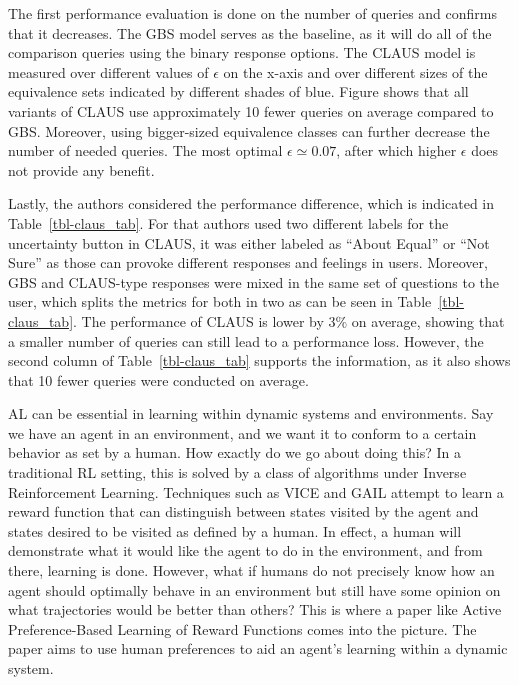 \documentclass[
  letterpaper,
  numbers=noenddot,
  DIV=11]{scrreprt}
\theoremstyle{plain}
\theoremstyle{definition}
\theoremstyle{remark}
\begin{document}
The first performance evaluation is done on the number of queries and
confirms that it decreases. The GBS model serves as the baseline, as it
will do all of the comparison queries using the binary response options.
The CLAUS model is measured over different values of \(\epsilon\) on the
x-axis and over different sizes of the equivalence sets indicated by
different shades of blue. Figure shows that all variants of CLAUS use
approximately 10 fewer queries on average compared to GBS. Moreover,
using bigger-sized equivalence classes can further decrease the number
of needed queries. The most optimal \(\epsilon \simeq 0.07\), after
which higher \(\epsilon\) does not provide any benefit.

Lastly, the authors considered the performance difference, which is
indicated in Table~\ref{tbl-claus_tab}. For that authors used two
different labels for the uncertainty button in CLAUS, it was either
labeled as ``About Equal'' or ``Not Sure'' as those can provoke
different responses and feelings in users. Moreover, GBS and CLAUS-type
responses were mixed in the same set of questions to the user, which
splits the metrics for both in two as can be seen in
Table~\ref{tbl-claus_tab}. The performance of CLAUS is lower by \(3\%\)
on average, showing that a smaller number of queries can still lead to a
performance loss. However, the second column of
Table~\ref{tbl-claus_tab} supports the information, as it also shows
that 10 fewer queries were conducted on average.

AL can be essential in learning within dynamic systems and environments.
Say we have an agent in an environment, and we want it to conform to a
certain behavior as set by a human. How exactly do we go about doing
this? In a traditional RL setting, this is solved by a class of
algorithms under Inverse Reinforcement Learning. Techniques such as VICE
and GAIL attempt to learn a reward function that can distinguish between
states visited by the agent and states desired to be visited as defined
by a human. In effect, a human will demonstrate what it would like the
agent to do in the environment, and from there, learning is done.
However, what if humans do not precisely know how an agent should
optimally behave in an environment but still have some opinion on what
trajectories would be better than others? This is where a paper like
Active Preference-Based Learning of Reward Functions comes into the
picture. The paper aims to use human preferences to aid an agent's
learning within a dynamic system.
\end{document}
